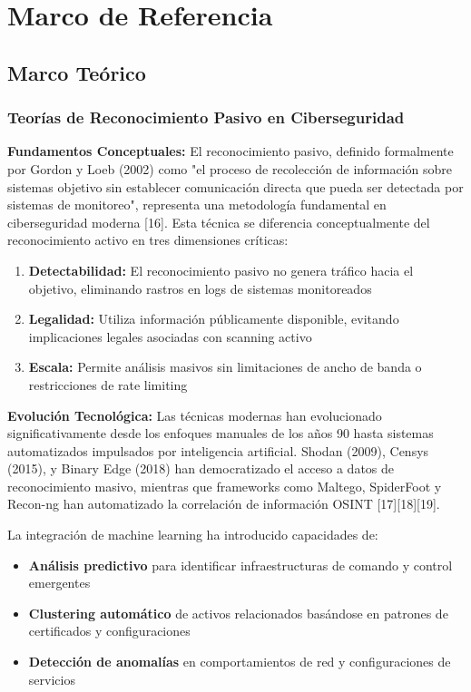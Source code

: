 \section{Marco de Referencia}

\subsection{Marco Teórico}

\subsubsection{Teorías de Reconocimiento Pasivo en Ciberseguridad}

\textbf{Fundamentos Conceptuales:}
El reconocimiento pasivo, definido formalmente por Gordon y Loeb (2002) como "el proceso de recolección de información sobre sistemas objetivo sin establecer comunicación directa que pueda ser detectada por sistemas de monitoreo", representa una metodología fundamental en ciberseguridad moderna [16]. Esta técnica se diferencia conceptualmente del reconocimiento activo en tres dimensiones críticas:

\begin{enumerate}
    \item \textbf{Detectabilidad:} El reconocimiento pasivo no genera tráfico hacia el objetivo, eliminando rastros en logs de sistemas monitoreados
    \item \textbf{Legalidad:} Utiliza información públicamente disponible, evitando implicaciones legales asociadas con scanning activo
    \item \textbf{Escala:} Permite análisis masivos sin limitaciones de ancho de banda o restricciones de rate limiting
\end{enumerate}

\textbf{Evolución Tecnológica:}
Las técnicas modernas han evolucionado significativamente desde los enfoques manuales de los años 90 hasta sistemas automatizados impulsados por inteligencia artificial. Shodan (2009), Censys (2015), y Binary Edge (2018) han democratizado el acceso a datos de reconocimiento masivo, mientras que frameworks como Maltego, SpiderFoot y Recon-ng han automatizado la correlación de información OSINT [17][18][19].

La integración de machine learning ha introducido capacidades de:
\begin{itemize}
    \item \textbf{Análisis predictivo} para identificar infraestructuras de comando y control emergentes
    \item \textbf{Clustering automático} de activos relacionados basándose en patrones de certificados y configuraciones
    \item \textbf{Detección de anomalías} en comportamientos de red y configuraciones de servicios
\end{itemize}

